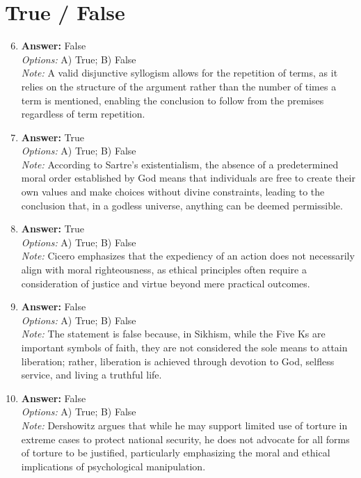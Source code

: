 \documentclass[12pt]{article}
\begin{document}
\section*{True / False}
\begin{enumerate}[label=\arabic*.]
\setcounter{enumi}{5}
\item \textbf{Answer:} False
\\ \textit{Options:} A) True; B) False
\\ \textit{Note:} A valid disjunctive syllogism allows for the repetition of terms, as it relies on the structure of the argument rather than the number of times a term is mentioned, enabling the conclusion to follow from the premises regardless of term repetition.
\item \textbf{Answer:} True
\\ \textit{Options:} A) True; B) False
\\ \textit{Note:} According to Sartre's existentialism, the absence of a predetermined moral order established by God means that individuals are free to create their own values and make choices without divine constraints, leading to the conclusion that, in a godless universe, anything can be deemed permissible.
\item \textbf{Answer:} True
\\ \textit{Options:} A) True; B) False
\\ \textit{Note:} Cicero emphasizes that the expediency of an action does not necessarily align with moral righteousness, as ethical principles often require a consideration of justice and virtue beyond mere practical outcomes.
\item \textbf{Answer:} False
\\ \textit{Options:} A) True; B) False
\\ \textit{Note:} The statement is false because, in Sikhism, while the Five Ks are important symbols of faith, they are not considered the sole means to attain liberation; rather, liberation is achieved through devotion to God, selfless service, and living a truthful life.
\item \textbf{Answer:} False
\\ \textit{Options:} A) True; B) False
\\ \textit{Note:} Dershowitz argues that while he may support limited use of torture in extreme cases to protect national security, he does not advocate for all forms of torture to be justified, particularly emphasizing the moral and ethical implications of psychological manipulation.
\end{enumerate}
\end{document}
